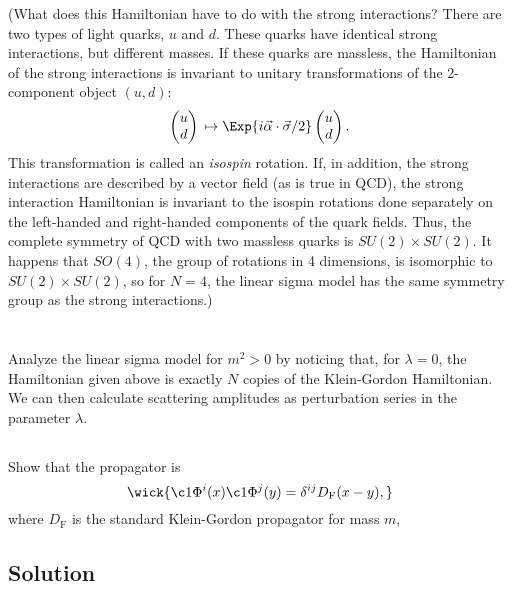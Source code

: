 (What does this Hamiltonian have to do with the strong interactions? There are two types of light quarks, $u$ and $d$. These quarks have identical strong interactions, but different masses. If these quarks are massless, the Hamiltonian of the strong interactions is invariant to unitary transformations of the 2-component object $(u, d)$:
\begin{equation*}
    \begin{pmatrix}
        u\\
        d
    \end{pmatrix}{}
    \mapsto
    \Exp{i \Vec{\alpha} \cdot \Vec{\sigma} / 2}
        \begin{pmatrix}
        u\\
        d
    \end{pmatrix}{}.
\end{equation*}{}
This transformation is called an \emph{isospin} rotation. If, in addition, the strong interactions are described by a vector  field (as is true in QCD), the strong interaction Hamiltonian is invariant to the isospin rotations done separately on the left-handed and right-handed components of the quark fields. Thus, the complete symmetry of QCD with two massless quarks is $SU(2) \times SU(2)$. It happens that $SO(4)$, the group of rotations in 4 dimensions, is isomorphic to $SU(2) \times SU(2)$, so for $N = 4$, the linear sigma model has the same symmetry group as the strong interactions.)

\section{}

Analyze the linear sigma model for $m^2 > 0$ by noticing that, for $\lambda = 0$, the Hamiltonian given above is exactly $N$ copies of the Klein-Gordon Hamiltonian. We can then calculate scattering amplitudes as perturbation series in the parameter $\lambda$.

\subsection{}
Show that the propagator is
\begin{equation*}
    \wick{
        \c1 \Phi^i(x) \c1 \Phi^j(y) = \delta^{ij} D_\mathrm{F}(x - y),
    } 
\end{equation*}{}
where $D_\mathrm{F}$ is the standard Klein-Gordon propagator for mass $m$,

\subsection*{Solution}

